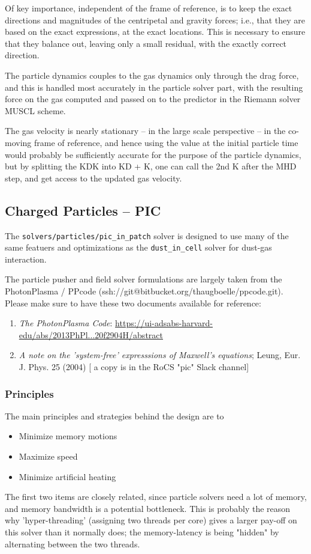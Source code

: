 \documentclass[paper=a4,fontsize=11pt]{scrartcl}
\numberwithin{equation}{section}		%
\numberwithin{figure}{section}			%
\numberwithin{table}{section}				%
\newcommand{\codecolor}{\color{Blue}}
\newcommand{\Code}[1]{{\codecolor\texttt{#1}}}
\begin{document}
Of key importance, independent of the frame of reference, is to keep the exact directions and magnitudes of the centripetal and gravity forces; i.e., that they are based on the exact expressions, at the exact locations. This is necessary to ensure that they balance out, leaving only a small residual, with the exactly correct direction.

The particle dynamics couples to the gas dynamics only through the drag force, and this is handled most accurately in the particle solver part, with the resulting force on the gas computed and passed on to the predictor in the Riemann solver MUSCL scheme.

The gas velocity is nearly stationary -- in the large scale perspective -- in the co-moving frame of reference, and hence using the value at the initial particle time would probably be sufficiently accurate for the purpose of the particle dynamics, but by splitting the KDK into KD + K, one can call the 2nd K after the MHD step, and get access to the updated gas velocity.

\subsection{Charged Particles -- PIC}
The \Code{solvers/particles/pic\_in\_patch} solver is designed to use many of the same featuers and optimizations as the \Code{dust\_in\_cell} solver for dust-gas interaction.  

The particle pusher and field solver formulations are largely taken from the PhotonPlasma / PPcode (ssh://git@bitbucket.org/thaugboelle/ppcode.git).  Please make sure to have these two documents available for reference:
\begin{enumerate}
    \item \textit{The PhotonPlasma Code}: \url{https://ui-adsabs-harvard-edu/abs/2013PhPl...20f2904H/abstract}
    \item \textit{A note on the 'system-free' expresssions of Maxwell's equations}; Leung, Eur. J. Phys. 25 (2004) [ a copy is in the RoCS "pic" Slack channel]
\end{enumerate}

\subsubsection{Principles}
The main principles and strategies behind the design are to
\begin{itemize}
    \item Minimize memory motions
    \item Maximize speed
    \item Minimize artificial heating
\end{itemize}
The first two items are closely related, since particle solvers need a lot of memory, and memory bandwidth is a potential bottleneck.  This is probably the reason why 'hyper-threading' (assigning two threads per core) gives a larger pay-off on this solver than it normally does; the memory-latency is being "hidden" by alternating between the two threads.
\end{document}

